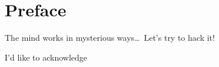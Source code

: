 \chapter{Preface}
The mind works in mysterious ways\ldots\
Let's try to hack it!

I'd like to acknowledge
